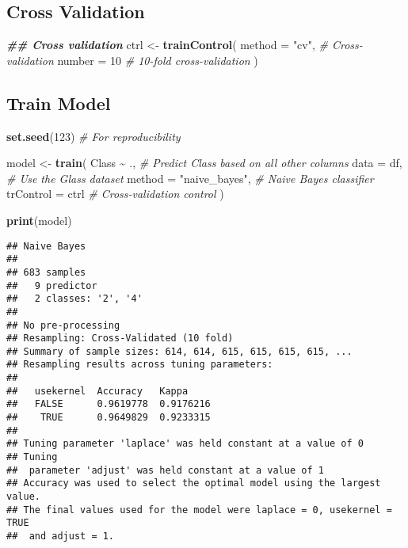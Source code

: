 \documentclass[
]{article}
\newenvironment{Shaded}{\begin{snugshade}}{\end{snugshade}}
\newcommand{\AttributeTok}[1]{\textcolor[rgb]{0.13,0.29,0.53}{#1}}
\newcommand{\CommentTok}[1]{\textcolor[rgb]{0.56,0.35,0.01}{\textit{#1}}}
\newcommand{\DecValTok}[1]{\textcolor[rgb]{0.00,0.00,0.81}{#1}}
\newcommand{\DocumentationTok}[1]{\textcolor[rgb]{0.56,0.35,0.01}{\textbf{\textit{#1}}}}
\newcommand{\FunctionTok}[1]{\textcolor[rgb]{0.13,0.29,0.53}{\textbf{#1}}}
\newcommand{\NormalTok}[1]{#1}
\newcommand{\OtherTok}[1]{\textcolor[rgb]{0.56,0.35,0.01}{#1}}
\newcommand{\SpecialCharTok}[1]{\textcolor[rgb]{0.81,0.36,0.00}{\textbf{#1}}}
\newcommand{\StringTok}[1]{\textcolor[rgb]{0.31,0.60,0.02}{#1}}
\begin{document}
\subsection{Cross Validation}\label{cross-validation}

\begin{Shaded}
\begin{Highlighting}[]
\DocumentationTok{\#\# Cross validation }
\NormalTok{ctrl }\OtherTok{\textless{}{-}} \FunctionTok{trainControl}\NormalTok{(}
  \AttributeTok{method =} \StringTok{"cv"}\NormalTok{,         }\CommentTok{\# Cross{-}validation}
  \AttributeTok{number =} \DecValTok{10}            \CommentTok{\# 10{-}fold cross{-}validation}
\NormalTok{)}
\end{Highlighting}
\end{Shaded}

\subsection{Train Model}\label{train-model}

\begin{Shaded}
\begin{Highlighting}[]
\FunctionTok{set.seed}\NormalTok{(}\DecValTok{123}\NormalTok{)  }\CommentTok{\# For reproducibility}

\NormalTok{model }\OtherTok{\textless{}{-}} \FunctionTok{train}\NormalTok{(}
\NormalTok{  Class }\SpecialCharTok{\textasciitilde{}}\NormalTok{ .,                }\CommentTok{\# Predict \textquotesingle{}Class\textquotesingle{} based on all other columns}
  \AttributeTok{data =}\NormalTok{ df,                }\CommentTok{\# Use the \textquotesingle{}Glass\textquotesingle{} dataset}
  \AttributeTok{method =} \StringTok{"naive\_bayes"}\NormalTok{,   }\CommentTok{\# Naive Bayes classifier}
  \AttributeTok{trControl =}\NormalTok{ ctrl          }\CommentTok{\# Cross{-}validation control}
\NormalTok{)}

\FunctionTok{print}\NormalTok{(model)}
\end{Highlighting}
\end{Shaded}

\begin{verbatim}
## Naive Bayes 
## 
## 683 samples
##   9 predictor
##   2 classes: '2', '4' 
## 
## No pre-processing
## Resampling: Cross-Validated (10 fold) 
## Summary of sample sizes: 614, 614, 615, 615, 615, 615, ... 
## Resampling results across tuning parameters:
## 
##   usekernel  Accuracy   Kappa    
##   FALSE      0.9619778  0.9176216
##    TRUE      0.9649829  0.9233315
## 
## Tuning parameter 'laplace' was held constant at a value of 0
## Tuning
##  parameter 'adjust' was held constant at a value of 1
## Accuracy was used to select the optimal model using the largest value.
## The final values used for the model were laplace = 0, usekernel = TRUE
##  and adjust = 1.
\end{verbatim}
\end{document}
